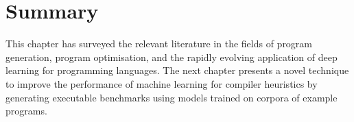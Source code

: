 \section{Summary}
\label{sec:related-work-summary}

This chapter has surveyed the relevant literature in the fields of program generation, program optimisation, and the rapidly evolving application of deep learning for programming languages. The next chapter presents a novel technique to improve the performance of machine learning for compiler heuristics by generating executable benchmarks using models trained on corpora of example programs.
